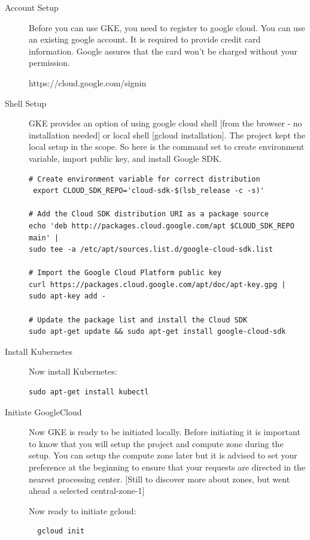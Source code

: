 \begin{description}

\item[Account Setup] Before you can use GKE, you need to register to
  google cloud. You can use an existing google account. It is required
  to provide credit card information.  Google assures that the card
  won't be charged without your permission.

https://cloud.google.com/signin

\item[Shell Setup] GKE provides an option of using google cloud shell
  [from the browser - no installation needed] or local shell [gcloud
  installation]. The project kept the local setup in the scope. So
  here is the command set to create environment variable, import
  public key, and install Google SDK.

\begin{verbatim}
# Create environment variable for correct distribution
 export CLOUD_SDK_REPO='cloud-sdk-$(lsb_release -c -s)'

# Add the Cloud SDK distribution URI as a package source
echo 'deb http://packages.cloud.google.com/apt $CLOUD_SDK_REPO main' | 
sudo tee -a /etc/apt/sources.list.d/google-cloud-sdk.list

# Import the Google Cloud Platform public key
curl https://packages.cloud.google.com/apt/doc/apt-key.gpg | sudo apt-key add -

# Update the package list and install the Cloud SDK
sudo apt-get update && sudo apt-get install google-cloud-sdk
\end{verbatim}

\item[Install Kubernetes] Now install Kubernetes:

\begin{verbatim}
sudo apt-get install kubectl
\end{verbatim}

\item[Initiate GoogleCloud] Now GKE is ready to be initiated locally. Before 
initiating it is 
important to know that you will setup the project and compute zone during the 
setup. You can setup the compute zone later but it is advised to set your 
preference at the beginning to ensure that your requests are directed in the 
nearest processing center. [Still to discover more about zones, but went ahead 
a selected central-zone-1] 

Now ready to initiate gcloud:
\begin{verbatim}
  gcloud init
\end{verbatim}


\end{description}
